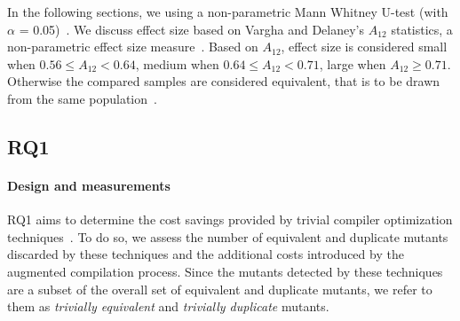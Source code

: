In the following sections, we 
using a non-parametric Mann Whitney U-test (with $\alpha$ = 0.05)~\cite{Arcuri:practicalGuide:ICSE:2015}.  We discuss effect size based on Vargha and Delaney’s $A_{12}$ statistics, a non-parametric effect size measure~\cite{VDA,Arcuri:practicalGuide:ICSE:2015}. Based on $A_{12}$, effect size is considered small when $0.56 \le A_{12} < 0.64$, medium when $0.64 \le A_{12} < 0.71$, large when $A_{12} \ge 0.71$. Otherwise the compared samples are considered equivalent, that is to be drawn from the same population~\cite{VDA}.


% 







%

\subsection{RQ1}




\paragraph{Design and measurements}

RQ1 aims to determine the cost savings provided by 
trivial compiler optimization techniques~\cite{papadakis2015trivial,kintis2017detecting}. To do so, we assess the number of equivalent and duplicate mutants discarded by these techniques and the additional costs introduced by the augmented compilation process. Since the mutants detected by these techniques 
are a subset of 
the overall set of equivalent and duplicate mutants, we refer to them as \emph{trivially equivalent} and \emph{trivially duplicate} mutants.

